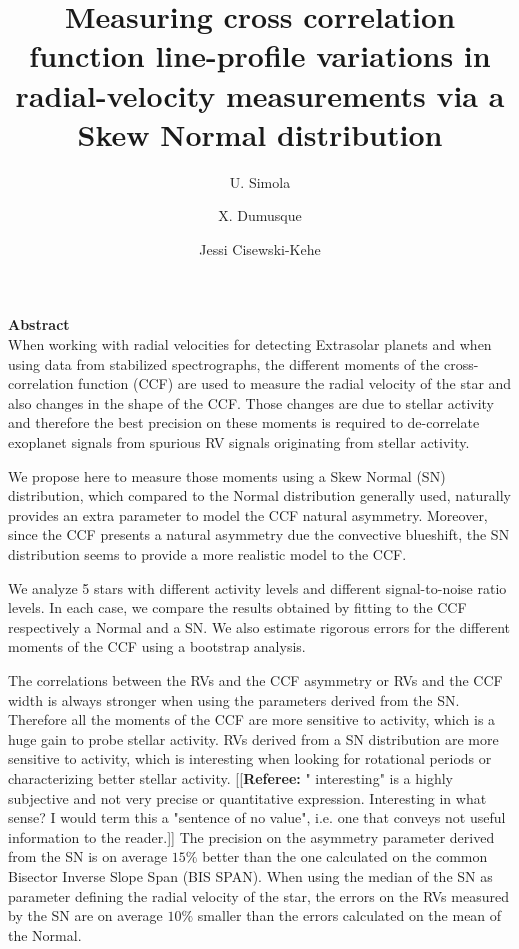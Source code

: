 \documentclass[11pt, oneside]{article}
\title{Measuring cross correlation function line-profile variations in radial-velocity measurements via a Skew Normal distribution}
\author{U. Simola
	    \and X. Dumusque
	    \and Jessi Cisewski-Kehe
	    }
\newcommand{\comment}[1]{{\color{red}[[\textbf{Referee: }#1]]}}
\begin{document}
\maketitle

{\bf Abstract}\\
When working with radial velocities for detecting Extrasolar planets and when using data from stabilized spectrographs, the different moments of the cross-correlation function (CCF) are used to measure the radial velocity of the star and also changes in the shape of the CCF. Those changes are due to stellar activity and therefore the best precision on these moments is required to de-correlate exoplanet signals from spurious RV signals originating from stellar activity.

We propose here to measure those moments using a Skew Normal (SN) distribution, which compared to the Normal distribution generally used, naturally provides an extra parameter to model the CCF natural asymmetry. Moreover, since the CCF presents a natural asymmetry due the convective blueshift, the SN distribution seems to provide a more realistic model to the CCF.

We analyze 5 stars with different activity levels and different signal-to-noise ratio levels. In each case, we compare the results obtained by fitting to the CCF respectively a Normal and a SN.  We also estimate rigorous errors for the different moments of the CCF using a bootstrap analysis.

The correlations between the RVs and the CCF asymmetry or RVs and the CCF width is always stronger when using the parameters derived from the SN. Therefore all the moments of the CCF are more sensitive to activity, which is a huge gain to probe stellar activity. RVs derived from a SN distribution are more sensitive to activity, which is interesting when looking for rotational periods or characterizing better stellar activity. 
\comment{" interesting" is a highly subjective and not very precise or quantitative expression. Interesting in what sense? I would term this a "sentence of no value", i.e. one that conveys not useful information to the reader.}
The precision on the asymmetry parameter derived from the SN is on average $15\%$ better than the one calculated on the common Bisector Inverse Slope Span (BIS SPAN). When using the median of the SN as parameter defining the radial velocity of the star, the errors on the RVs measured by the SN are on average $10\%$ smaller than the errors calculated on the mean of the Normal.
\end{document}
